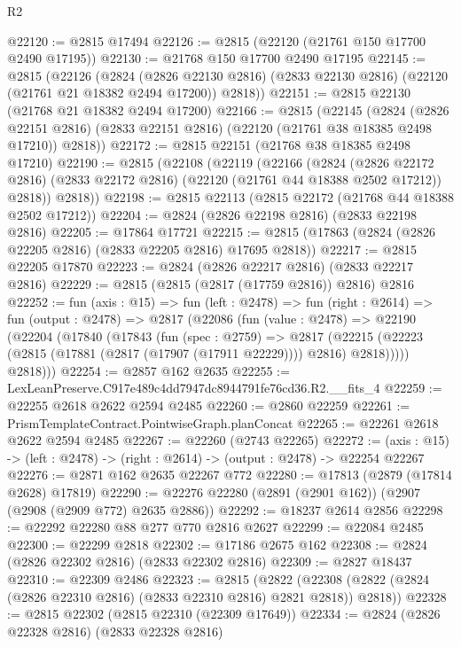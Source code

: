 \begin{lexlean}{R2}
\begin{coremodule}
@22120 := @2815 @17494
@22126 := @2815 (@22120 (@21761 @150 @17700 @2490 @17195))
@22130 := @21768 @150 @17700 @2490 @17195
@22145 := @2815
    (@22126
      (@2824
        (@2826 @22130 @2816)
        (@2833 @22130 @2816)
        (@22120 (@21761 @21 @18382 @2494 @17200))
        @2818))
@22151 := @2815 @22130 (@21768 @21 @18382 @2494 @17200)
@22166 := @2815
    (@22145
      (@2824
        (@2826 @22151 @2816)
        (@2833 @22151 @2816)
        (@22120 (@21761 @38 @18385 @2498 @17210))
        @2818))
@22172 := @2815 @22151 (@21768 @38 @18385 @2498 @17210)
@22190 := @2815
    (@22108
      (@22119
        (@22166
          (@2824
            (@2826 @22172 @2816)
            (@2833 @22172 @2816)
            (@22120 (@21761 @44 @18388 @2502 @17212))
            @2818))
        @2818))
@22198 := @2815 @22113 (@2815 @22172 (@21768 @44 @18388 @2502 @17212))
@22204 := @2824 (@2826 @22198 @2816) (@2833 @22198 @2816)
@22205 := @17864 @17721
@22215 := @2815 (@17863 (@2824 (@2826 @22205 @2816) (@2833 @22205 @2816) @17695 @2818))
@22217 := @2815 @22205 @17870
@22223 := @2824 (@2826 @22217 @2816) (@2833 @22217 @2816)
@22229 := @2815 (@2815 (@2817 (@17759 @2816)) @2816) @2816
@22252 := fun (axis : @15) =>
  fun (left : @2478) =>
  fun (right : @2614) =>
  fun (output : @2478) =>
  @2817
    (@22086
      (fun (value : @2478) =>
      @22190
        (@22204
          (@17840
            (@17843
              (fun (spec : @2759) =>
              @2817
                (@22215 (@22223 (@2815 (@17881 (@2817 (@17907 (@17911 @22229)))) @2816) @2818)))))
          @2818)))
@22254 := @2857 @162 @2635
@22255 := LexLeanPreserve.C917e489c4dd7947dc8944791fe76cd36.R2.__fits_4
@22259 := @22255 @2618 @2622 @2594 @2485
@22260 := @2860 @22259
@22261 := PrismTemplateContract.PointwiseGraph.planConcat
@22265 := @22261 @2618 @2622 @2594 @2485
@22267 := @22260 (@2743 @22265)
@22272 := (axis : @15) -> (left : @2478) -> (right : @2614) -> (output : @2478) -> @22254 @22267
@22276 := @2871 @162 @2635 @22267 @772
@22280 := @17813 (@2879 (@17814 @2628) @17819)
@22290 := @22276 @22280 (@2891 (@2901 @162)) (@2907 (@2908 (@2909 @772) @2635 @2886))
@22292 := @18237 @2614 @2856
@22298 := @22292 @22280 @88 @277 @770 @2816 @2627
@22299 := @22084 @2485
@22300 := @22299 @2818
@22302 := @17186 @2675 @162
@22308 := @2824 (@2826 @22302 @2816) (@2833 @22302 @2816)
@22309 := @2827 @18437
@22310 := @22309 @2486
@22323 := @2815
    (@2822 (@22308 (@2822 (@2824 (@2826 @22310 @2816) (@2833 @22310 @2816) @2821 @2818)) @2818))
@22328 := @2815 @22302 (@2815 @22310 (@22309 @17649))
@22334 := @2824 (@2826 @22328 @2816) (@2833 @22328 @2816)

\end{coremodule}
\end{lexlean}

